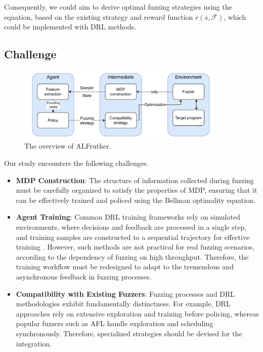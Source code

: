 \documentclass[lettersize,journal]{IEEEtran}
\begin{document}
Consequently, we could aim to derive optimal fuzzing strategies using the equation, based on the existing strategy and reward function $r(s, \mathcal{F})$, which could be implemented with DRL methods.


\subsection{Challenge}\label{subsec:challenge}

\begin{figure}[t!]
	\centerline{\includegraphics[width=0.9\textwidth]{fig/simplified_overview.pdf}}
	\caption{The overview of ALFruther.}
	\label{fig:overview}
\end{figure}

Our study encounters the following challenges.
\begin{itemize}
	\item \textbf{MDP Construction}: The structure of information collected during fuzzing must be carefully organized to satisfy the properties of MDP, ensuring that it can be effectively trained and policed using the Bellman optimality equation.
	\item \textbf{Agent Training}: Common DRL training frameworks rely on simulated environments, where decisions and feedback are processed in a single step, and training samples are constructed to a sequential trajectory for effective training \cite{schulmanProximalPolicyOptimization2017}. However, such methods are not practical for real fuzzing scenarios, according to the dependency of fuzzing on high throughput. Therefore, the training workflow must be redesigned to adapt to the tremendous and asynchronous feedback in fuzzing processes.
	\item \textbf{Compatibility with Existing Fuzzers}: Fuzzing processes and DRL methodologies exhibit fundamentally distinctness. For example, DRL approaches rely on extensive exploration and training before policing, whereas popular fuzzers such as AFL handle exploration and scheduling synchronously. Therefore, specialized strategies should be devised for the integration.
\end{itemize}
\end{document}
